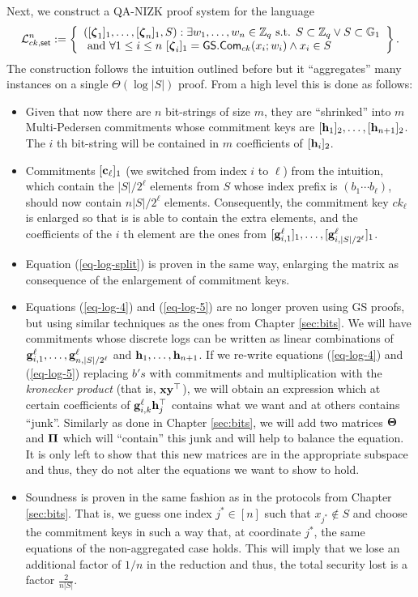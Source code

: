 Next, we construct a QA-NIZK proof system for the language
$$
\Lang_{ck,\mathsf{set}}^n:=\left\{\begin{array}{l}
([\grkb{\zeta}_1]_1,\ldots,[\grkb{\zeta}_n]_1,S):\exists w_1,\ldots,w_n\in\Z_q \text{ s.t. } S\subset\Z_q\vee S\subset \GG_1\\
\text{ and } \forall 1\leq i\leq n\ [\grkb{\zeta}_i]_1=\GS.\Com_{ck}(x_i;w_i)\wedge x_i\in S
\end{array}\right\}.
$$
The construction follows the intuition outlined before but it ``aggregates'' many instances on a single $\Theta(\log |S|)$ proof. From a high level this is done as follows:
\begin{itemize}
\item Given that now there are $n$ bit-strings of size $m$, they are ``shrinked'' into $m$ Multi-Pedersen commitments whose commitment keys are $[\mathbf{h}_1]_2,\ldots,[\mathbf{h}_{n+1}]_2$. The $i$ th bit-string will be contained in $m$ coefficients of $[\mathbf{h}_i]_2$.
\item Commitments $[\mathbf{c}_\ell]_1$ (we switched from index $i$ to $\ell$) from the intuition, which contain the $|S|/2^\ell$ elements from $S$ whose index prefix is $(b_1\cdots b_{\ell})$, should now contain $n|S|/2^\ell$ elements. Consequently, the commitment key $ck_\ell$ is enlarged so that is is able to contain the extra elements, and the coefficients of the $i$ th element are the ones from $[\mathbf{g}_{i,1}^\ell]_1,\ldots,[\mathbf{g}_{i,|S|/2^\ell}^\ell]_1$.
\item Equation (\ref{eq-log-split}) is proven in the same way, enlarging the matrix as consequence of the enlargement of commitment keys.
\item Equations (\ref{eq-log-4}) and (\ref{eq-log-5}) are no longer proven using GS proofs, but using similar techniques as the ones from Chapter \ref{sec:bits}. We will have commitments whose discrete logs can be written as linear combinations of $\mathbf{g}_{i,1}^\ell,\ldots,\mathbf{g}_{n,|S|/2^\ell}^\ell$ and $\mathbf{h}_1,\ldots,\mathbf{h}_{n+1}$. If we re-write equations (\ref{eq-log-4}) and (\ref{eq-log-5}) replacing $b's$ with commitments and multiplication with the \emph{kronecker product} (that is, $\mathbf{x}\mathbf{y}^\top$), we will obtain an expression which at certain coefficients of $\mathbf{g}_{i,k}^\ell\mathbf{h}_j^\top$ contains what we want and at others contains ``junk''. Similarly as done in Chapter \ref{sec:bits}, we will add two matrices $\mathbf{{\Theta}}$ and $\mathbf{{\Pi}}$ which will ``contain'' this junk and will help to balance the equation. It is only left to show that this new matrices are in the appropriate subspace and thus, they do not alter the equations we want to show to hold.
\item Soundness is proven in the same fashion as in the protocols from Chapter \ref{sec:bits}. That is, we guess one index $j^*\in[n]$ such that $x_{j^*}\notin S$ and choose the commitment keys in such a way that, at coordinate $j^*$, the same equations of the non-aggregated case holds. This will imply that we lose an additional factor of $1/n$ in the reduction and thus, the total security lost is a factor $\frac{2}{n|S|}$.
\end{itemize}
